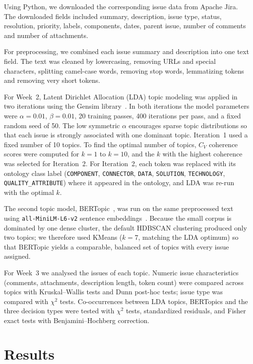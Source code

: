 \documentclass[11pt,a4paper]{report}
\begin{document}
Using Python, we downloaded the corresponding issue data from Apache Jira. The
downloaded fields included summary, description, issue type, status, resolution,
priority, labels, components, dates, parent issue, number of comments and number
of attachments.

For preprocessing, we combined each issue summary and description into one text
field. The text was cleaned by lowercasing, removing URLs and special
characters, splitting camel-case words, removing stop words, lemmatizing tokens
and removing very short tokens.

For Week~2, Latent Dirichlet Allocation (LDA) topic modeling was applied in two
iterations using the Gensim library~\cite{gensim}. In both iterations the model
parameters were $\alpha=0.01$, $\beta=0.01$, 20 training passes, 400 iterations
per pass, and a fixed random seed of 50. The low symmetric $\alpha$ encourages
sparse topic distributions so that each issue is strongly associated with one
dominant topic. Iteration~1 used a fixed number of 10 topics. To find the
optimal number of topics, $C_V$ coherence scores were computed for $k=1$ to
$k=10$, and the $k$ with the highest coherence was selected for Iteration~2. For
Iteration~2, each token was replaced with its ontology class label
(\texttt{COMPONENT}, \texttt{CONNECTOR}, \texttt{DATA}, \texttt{SOLUTION},
\texttt{TECHNOLOGY}, \texttt{QUALITY\_ATTRIBUTE}) where it appeared in the
ontology, and LDA was re-run with the optimal $k$.

The second topic model, BERTopic~\cite{bertopic}, was run on the same
preprocessed text using \texttt{all-MiniLM-L6-v2} sentence
embeddings~\cite{sbert}. Because the small corpus is dominated by one dense
cluster, the default HDBSCAN clustering produced only two topics; we therefore
used KMeans ($k=7$, matching the LDA optimum) so that BERTopic yields a
comparable, balanced set of topics with every issue assigned.

For Week~3 we analysed the issues of each topic. Numeric issue characteristics
(comments, attachments, description length, token count) were compared across
topics with Kruskal--Wallis tests and Dunn post-hoc tests; issue type was
compared with $\chi^2$ tests. Co-occurrences between LDA topics, BERTopics and
the three decision types were tested with $\chi^2$ tests, standardized
residuals, and Fisher exact tests with Benjamini--Hochberg correction.

\chapter{Results}
\end{document}

